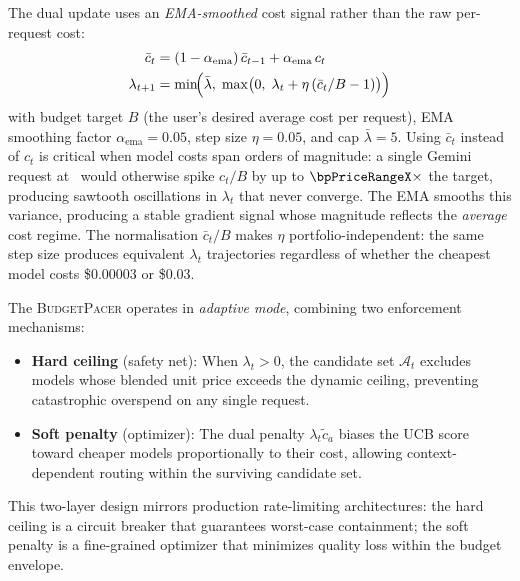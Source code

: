 The dual update uses an \emph{EMA-smoothed} cost signal rather than
the raw per-request cost:
\begin{align}
    \bar{c}_t &= (1 - \alpha_{\mathrm{ema}})\,\bar{c}_{t-1}
                 + \alpha_{\mathrm{ema}}\,c_t
    \label{eq:cost_ema} \\
    \lambda_{t+1} &= \min\!\Bigl(\bar\lambda,\;
    \max\bigl(0,\;\lambda_t + \eta\,(\bar{c}_t / B - 1)\bigr)\Bigr)
    \label{eq:dual_update}
\end{align}
with budget target $B$ (the user's desired average cost per request),
EMA smoothing factor $\alpha_{\mathrm{ema}}{=}0.05$,
step size $\eta{=}0.05$, and cap $\bar\lambda{=}5$.
Using $\bar{c}_t$ instead of $c_t$ is critical when model costs span
orders of magnitude: a single Gemini request at \bpFixedGeminiCost\
would otherwise spike $c_t/B$ by up to $\bpPriceRangeX\times$ the target,
producing sawtooth oscillations in $\lambda_t$ that never converge.
The EMA smooths this variance, producing a stable gradient signal
whose magnitude reflects the \emph{average} cost regime.
The normalisation $\bar{c}_t / B$ makes $\eta$ portfolio-independent:
the same step size produces equivalent $\lambda_t$ trajectories regardless
of whether the cheapest model costs \$0.00003 or \$0.03.

The \textsc{BudgetPacer} operates in \emph{adaptive mode}, combining
two enforcement mechanisms:
\begin{itemize}[nosep,leftmargin=*]
  \item \textbf{Hard ceiling} (safety net):
    When $\lambda_t > 0$, the candidate set $\mathcal{A}_t$ excludes
    models whose blended unit price exceeds the dynamic ceiling,
    preventing catastrophic overspend on any single request.
  \item \textbf{Soft penalty} (optimizer):
    The dual penalty $\lambda_t\tilde{c}_a$ biases the UCB score toward
    cheaper models proportionally to their cost, allowing context-dependent
    routing within the surviving candidate set.
\end{itemize}

\noindent
This two-layer design mirrors production rate-limiting architectures:
the hard ceiling is a circuit breaker that guarantees worst-case
containment; the soft penalty is a fine-grained optimizer that
minimizes quality loss within the budget envelope.


